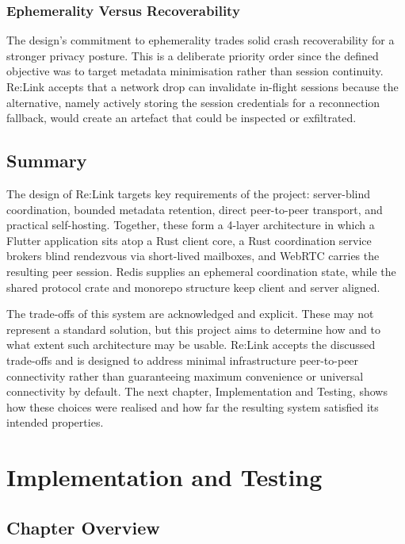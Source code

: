 \documentclass[12pt,a4paper]{article}
\begin{document}
\subsubsection{Ephemerality Versus Recoverability}

The design’s commitment to ephemerality trades solid crash recoverability for a stronger privacy posture. This is a deliberate priority order since the defined objective was to target metadata minimisation rather than session continuity. Re:Link accepts that a network drop can invalidate in-flight sessions because the alternative, namely actively storing the session credentials for a reconnection fallback, would create an artefact that could be inspected or exfiltrated.

\subsection{Summary}

The design of Re:Link targets key requirements of the project: server-blind coordination, bounded metadata retention, direct peer-to-peer transport, and practical self-hosting. Together, these form a 4-layer architecture in which a Flutter application sits atop a Rust client core, a Rust coordination service brokers blind rendezvous via short-lived mailboxes, and WebRTC carries the resulting peer session. Redis supplies an ephemeral coordination state, while the shared protocol crate and monorepo structure keep client and server aligned.

The trade-offs of this system are acknowledged and explicit. These may not represent a standard solution, but this project aims to determine how and to what extent such architecture may be usable. Re:Link accepts the discussed trade-offs and is designed to address minimal infrastructure peer-to-peer connectivity rather than guaranteeing maximum convenience or universal connectivity by default. The next chapter, Implementation and Testing, shows how these choices were realised and how far the resulting system satisfied its intended properties.

\section{Implementation and Testing}

\subsection{Chapter Overview}
\end{document}
